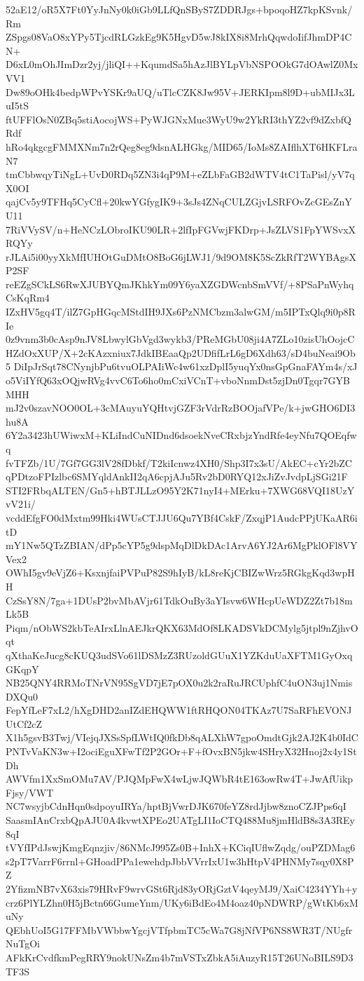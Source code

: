 52aE12/oR5X7Ft0YyJnNy0k0iGb9LLfQnSByS7ZDDRJgs+bpoqoHZ7kpKSvnk/Rm
ZSpgs08VaO8xYPy5TjcdRLGzkEg9K5HgvD5wJ8kIX8i8MrhQqwdoIifJhmDP4CN+
D6xL0mOhJImDzr2yj/jliQI++KqumdSa5hAzJlBYLpVbNSPOOkG7dOAwlZ0MxVV1
Dw89oOHk4bedpWPvYSKr9aUQ/uTlcCZK8Jw95V+JERKIpm8l9D+ubMIJx3LuI5tS
ftUFFlOsN0ZBq5stiAocojWS+PyWJGNxMue3WyU9w2YkRI3thYZ2vf9dZxbfQRdf
hRo4qkgcgFMMXNm7n2rQeg8eg9dsnALHGkg/MID65/IoMs8ZAIflhXT6HKFLraN7
tmCbbwqyTiNgL+UvD0RDq5ZN3i4qP9M+eZLbFaGB2dWTV4tC1TaPisl/yV7qX0OI
qajCv5y9TFHq5CyCfl+20kwYGfygIK9+3sJs4ZNqCULZGjvLSRFOvZcGEsZnYU11
7RiVVySV/n+HeNCzLObroIKU90LR+2lfIpFGVwjFKDrp+JsZLVS1FpYWSvxXRQYy
rJLAi5i00yyXkMfIUHOtGuDMtO8BoG6jLWJ1/9d9OM8K5ScZkRfT2WYBAgsXP2SF
reEZgSCkLS6RwXJUBYQmJKhkYm09Y6yaXZGDWcnbSmVVf/+8PSaPnWyhqCsKqRm4
IZxHV5gq4T/ilZ7GpHGqcMStdIH9JXs6PzNMCbzm3alwGM/m5IPTxQlq9i0p8RIe
0z9vnm3b0cAsp9nJV8LbwylGbVgd3wykb3/PReMGbU08ji4A7ZLo10zisUhOojcC
HZdOxXUP/X+2cKAzxniux7JdkIBEaaQp2UDfifLrL6gD6Xdh63/sD4buNeai9Ob5
DiIpJrSqt78CNynjbPu6tvuOLPAIiWc4w61xzDplI5yuqYx0nsGpGnaFAYm4s/xJ
o5ViIYfQ63xOQjwRVg4vvC6To6ho0mCxiVCnT+vboNnmDst5zjDn0Tgqr7GYBMHH
mJ2v0szavNOO0OL+3cMAuyuYQHtvjGZF3rVdrRzBOOjafVPe/k+jwGHO6DI3hu8A
6Y2a3423hUWiwxM+KLiIndCuNIDnd6dsoekNveCRxbjzYndRfe4eyNfu7QOEqfwq
fvTFZb/1U/7Gf7GG3lV28fDbkf/T2kiIcnwz4XH0/Shp3I7x3sU/AkEC+cYr2bZC
qPDtzoFPIzlbc6SMYqldAnkII2qA6cpjAJu5Rv2bD0RYQ12xJiZvJvdpLjSGi21F
STI2FRbqALTEN/Gn5+hBTJLLzO95Y2K71nyI4+MErku+7XWG68VQI18UzYvV21i/
vcddEfgFO0dMxtm99Hki4WUsCTJJU6Qu7YBf4CskF/ZxqjP1AudcPPjUKaAR6itD
mY1Nw5QTzZBIAN/dPp5cYP5g9dspMqDlDkDAc1ArvA6YJ2Ar6MgPklOFl8VYVex2
OWhI5gv9eVjZ6+KsxnjfaiPVPuP82S9hIyB/kL8reKjCBIZwWrz5RGkgKqd3wpHH
CzSsY8N/7ga+1DUsP2bvMbAVjr61TdkOuBy3aYIsvw6WHcpUeWDZ2Zt7b18mLk5B
Piqm/nObWS2kbTeAIrxLlnAEJkrQKX63MdOf8LKADSVkDCMylg5jtpl9nZjhvOqt
qXthaKeJucg8cKUQ3udSVo61lDSMzZ3RUzoldGUuX1YZKduUaXFTM1GyOxqGKqpY
NB25QNY4RRMoTNrVN95SgVD7jE7pOX0u2k2raRuJRCUphfC4uON3uj1NmisDXQu0
FepYfLeF7xL2/hXgDHD2anIZdEHQWW1ftRHQON04TKAz7U7SaRFhEVONJUtCf2cZ
X1h5gsvB3Twj/VIejqJXSsSpfLWtIQ0fkDb8qALXhW7gpoOmdtGjk2AJ2K4b0IdC
PNTvVaKN3w+I2ociEguXFwTf2P2GOr+F+fOvxBN5jkw4SHryX32Hnoj2x4y1StDh
AWVfm1XxSmOMu7AV/PJQMpFwX4wLjwJQWbR4tE163owRw4T+JwAfUikpFjsy/VWT
NC7wsyjbCdnHqn0sdpoyuIRYa/hptBjVwrDJK670feYZ8rdJjbw8znoCZJPps6qI
SaasmIAnCrxbQpAJU0A4kvwtXPEo2UATgLI1IoCTQ488Mu8jmHldB8s3A3REy8qI
tVYfIPdJswjKmgEqnzjiv/86NMcJ995Zs0B+InhX+KCiqIUflwZqdg/ouPZDMag6
s2pT7VarrF6rrnl+GHoadPPa1ewehdpJbbVVrrIxU1w3hHtpV4PHNMy7sqy0X8PZ
2YfizmNB7vX63xis79HRvF9wrvGSt6Rjd83yORjGztV4qeyMJ9/XaiC4234YYh+y
crz6PlYLZhn0H5jBctn66GumeYnm/UKy6iBdEo4M4oaz40pNDWRP/gWtKb6xMuNy
QEbhUoI5G17FFMbVWbbwYgcjVTfpbmTC5cWa7G8jNfVP6NS8WR3T/NUgfrNuTgOi
AFkKrCvdfkmPegRRY9nokUNsZm4b7mVSTxZbkA5iAuzyR15T26UNoBILS9D3TF3S
